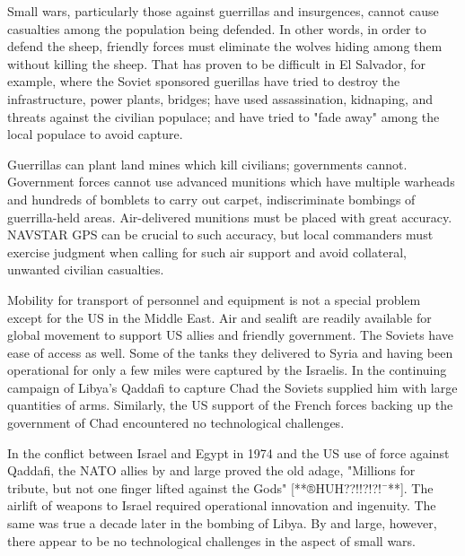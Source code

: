 Small wars, particularly those against guerrillas and insurgences, cannot cause casualties among the population being defended. In other words, in order to defend the sheep, friendly forces must eliminate the wolves hiding among them without killing the sheep. That has proven to be difficult in El Salvador, for example, where the Soviet sponsored guerillas have tried to destroy the infrastructure, power plants, bridges; have used assassination, kidnaping, and threats against the civilian populace; and have tried to "fade away" among the local populace to avoid capture.

Guerrillas can plant land mines which kill civilians; governments cannot. Government forces cannot use advanced munitions which have multiple warheads and hundreds of bomblets to carry out carpet, indiscriminate bombings of guerrilla-held areas. Air-delivered munitions must be placed with great accuracy. NAVSTAR GPS can be crucial to such accuracy, but local commanders must exercise judgment when calling for such air support and avoid collateral, unwanted civilian casualties.

Mobility for transport of personnel and equipment is not a special problem except for the US in the Middle East. Air and sealift are readily available for global movement to support US allies and friendly government. The Soviets have ease of access as well. Some of the tanks they delivered to Syria and having been operational for only a few miles were captured by the Israelis. In the continuing campaign of Libya's Qaddafi to capture Chad the Soviets supplied him with large quantities of arms. Similarly, the US support of the French forces backing up the government of Chad encountered no technological challenges.

In the conflict between Israel and Egypt in 1974 and the US use of force against Qaddafi, the NATO allies by and large proved the old adage, "Millions for tribute, but not one finger lifted against the Gods" [**®HUH??!!?!?!¯**]. The airlift of weapons to Israel required operational innovation and ingenuity. The same was true a decade later in the bombing of Libya. By and large, however, there appear to be no technological challenges in the aspect of small wars.

